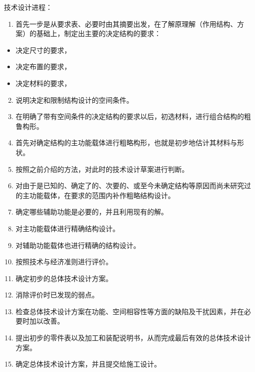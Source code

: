 \documentclass[letterpaper,10pt,english]{sphinxmanual}
\begin{document}
技术设计进程：
\begin{enumerate}
\item {} 
首先一步是从要求表、必要时由其摘要出发，在了解原理解（作用结构、方案）的基础上，制定出主要的决定结构的要求：

\end{enumerate}
\begin{itemize}
\item {} 
决定尺寸的要求，

\item {} 
决定布置的要求，

\item {} 
决定材料的要求，

\end{itemize}
\begin{enumerate}
\setcounter{enumi}{1}
\item {} 
说明决定和限制结构设计的空间条件。

\item {} 
在明确了带有空间条件的决定结构的要求以后，初选材料，进行组合结构的粗鲁构形。

\item {} 
首先对确定结构的主功能载体进行粗略构形，也就是初步地估计其材料与形状。

\item {} 
按照之前介绍的方法，对此时的技术设计草案进行判断。

\item {} 
对由于是已知的、确定了的、次要的、或至今未确定结构等原因而尚未研究过的主功能载体，在要求的范围内补作粗略结构设计。

\item {} 
确定哪些辅助功能是必要的，并且利用现有的解。

\item {} 
对主功能载体进行精确结构设计。

\item {} 
对辅助功能载体也进行精确的结构设计。

\item {} 
按照技术与经济准则进行评价。

\item {} 
确定初步的总体技术设计方案。

\item {} 
消除评价时已发现的弱点。

\item {} 
检查总体技术设计方案在功能、空间相容性等方面的缺陷及干扰因素，并在必要时加以改善。

\item {} 
提出初步的零件表以及加工和装配说明书，从而完成最后有效的总体技术设计方案。

\item {} 
确定总体技术设计方案，并且提交给施工设计。

\end{enumerate}
\end{document}

